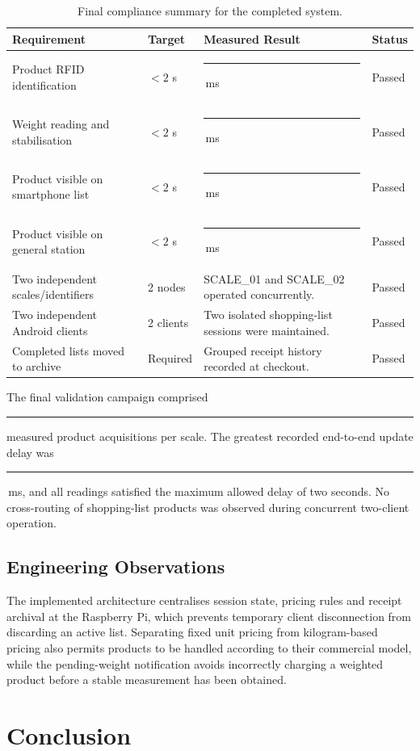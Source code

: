 \documentclass[11pt,a4paper]{article}
\newcommand{\blankvalue}[1]{\rule{#1}{0.4pt}}
\newcommand{\blankms}{\blankvalue{1.35cm}\,ms}
\begin{document}
\begin{table}[H]
\centering
\caption{Final compliance summary for the completed system.}
\label{tab:compliance}
\begin{tabularx}{\textwidth}{@{}p{}p{}Y p{0.14\textwidth}@{}}
\toprule
\textbf{Requirement} & \textbf{Target} & \textbf{Measured Result} & \textbf{Status} \\
\midrule
Product RFID identification & $< 2$ s & \blankms & Passed \\
Weight reading and stabilisation & $< 2$ s &  \blankms & Passed \\
Product visible on smartphone list & $< 2$ s &  \blankms & Passed \\
Product visible on general station & $< 2$ s & \blankms & Passed \\
Two independent scales/identifiers & 2 nodes & SCALE\_01 and SCALE\_02 operated concurrently. & Passed \\
Two independent Android clients & 2 clients & Two isolated shopping-list sessions were maintained. & Passed \\
Completed lists moved to archive & Required & Grouped receipt history recorded at checkout. & Passed \\
\bottomrule
\end{tabularx}
\end{table}

The final validation campaign comprised \blankvalue{1.4cm} measured product acquisitions per scale. The greatest recorded end-to-end update delay was \blankms, and all readings satisfied the maximum allowed delay of two seconds. No cross-routing of shopping-list products was observed during concurrent two-client operation.

\subsection{Engineering Observations}

The implemented architecture centralises session state, pricing rules and receipt archival at the Raspberry Pi, which prevents temporary client disconnection from discarding an active list. Separating fixed unit pricing from kilogram-based pricing also permits products to be handled according to their commercial model, while the pending-weight notification avoids incorrectly charging a weighted product before a stable measurement has been obtained.

\section{Conclusion}
\end{document}
